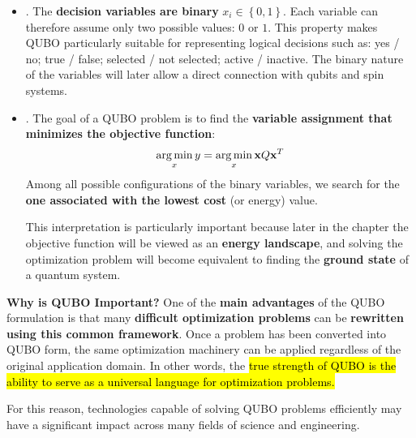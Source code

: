\begin{itemize}
    In contrast, the \textbf{QUBO solver} receives only $\min \mathbf{x} Q \mathbf{x}^{T}$ and has no information about any constraints. Therefore, the solver cannot enforce the constraint $x_1 + x_2 = 1$ directly. Instead, we need to modify the objective function to include a \textbf{penalty term that discourages solutions that violate the constraint}. For example, we could add a term like $P (x_1 + x_2 - 1)^2$ to the objective function, where $P$ is a large positive constant. This way, any solution that does not satisfy $x_1 + x_2 = 1$ will incur a large penalty, effectively enforcing the constraint indirectly.


    \item {}. The \textbf{decision variables are binary} $x_{i} \in \left\{0, 1\right\}$. Each variable can therefore assume only two possible values: $0$ or $1$. This property makes QUBO particularly suitable for representing logical decisions such as: yes / no; true / false; selected / not selected; active / inactive. The binary nature of the variables will later allow a direct connection with qubits and spin systems.


    \item {}. The goal of a QUBO problem is to find the \textbf{variable assignment that minimizes the objective function}:
    \begin{equation*}
    \operatorname*{arg\,min}_{x} y = \operatorname*{arg\,min}_{x} \mathbf{x} Q \mathbf{x}^{T}
    \end{equation*}
    Among all possible configurations of the binary variables, we search for the \textbf{one associated with the lowest cost} (or energy) value.

    This interpretation is particularly important because later in the chapter the objective function will be viewed as an \textbf{energy landscape}, and solving the optimization problem will become equivalent to finding the \textbf{ground state} of a quantum system.
\end{itemize}
\textcolor{Green3}{ \textbf{Why is QUBO Important?}} One of the \textbf{main advantages} of the QUBO formulation is that many \textbf{difficult optimization problems} can be \textbf{rewritten using this common framework}. Once a problem has been converted into QUBO form, the same optimization machinery can be applied regardless of the original application domain. In other words, the \hl{true strength of QUBO is the ability to serve as a universal language for optimization problems.}

\highspace
For this reason, technologies capable of solving QUBO problems efficiently may have a significant impact across many fields of science and engineering.